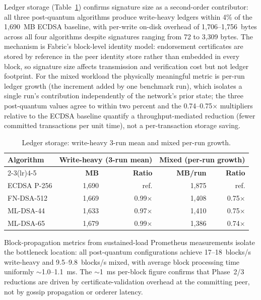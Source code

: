 \documentclass{ieeetj}
\begin{document}
Ledger storage (Table~\ref{tab:storage_results}) confirms signature
size as a second-order contributor: all three post-quantum algorithms
produce write-heavy ledgers within 4\% of the 1{,}690~MB ECDSA
baseline, with per-write on-disk overhead of 1{,}706--1{,}756~bytes
across all four algorithms despite signatures ranging from 72 to
3{,}309 bytes. The mechanism is Fabric's block-level identity model:
endorsement certificates are stored by reference in the peer identity
store rather than embedded in every block, so signature size affects
transmission and verification cost but not ledger footprint. For the
mixed workload the physically meaningful metric is per-run ledger
growth (the increment added by one benchmark run), which isolates a
single run's contribution independently of the network's prior
state; the three post-quantum values agree to within two percent and
the 0.74--0.75$\times$ multipliers relative to the ECDSA baseline
quantify a throughput-mediated reduction (fewer committed
transactions per unit time), not a per-transaction storage saving.

\begin{table}[ht]
\centering
\caption{Ledger storage: write-heavy 3-run mean and mixed per-run growth.}
\label{tab:storage_results}
\footnotesize

\begin{tabular*}{\columnwidth}{@{\extracolsep{\fill}}lrrrr@{}}
\toprule
\textbf{Algorithm} &
\multicolumn{2}{c}{\textbf{Write-heavy (3-run mean)}} &
\multicolumn{2}{c}{\textbf{Mixed (per-run growth)}} \\
\cmidrule(lr){2-3}\cmidrule(lr){4-5}
& \textbf{MB} & \textbf{Ratio} & \textbf{MB/run} & \textbf{Ratio} \\
\midrule
ECDSA P-256 & 1,690 & ref.        & 1,875 & ref.         \\
FN-DSA-512  & 1,669 & 0.99$\times$ & 1,408 & 0.75$\times$ \\
ML-DSA-44   & 1,633 & 0.97$\times$ & 1,410 & 0.75$\times$ \\
ML-DSA-65   & 1,679 & 0.99$\times$ & 1,386 & 0.74$\times$ \\
\bottomrule
\end{tabular*}
\end{table}
Block-propagation metrics from sustained-load Prometheus measurements
isolate the bottleneck location: all post-quantum configurations achieve
17--18~blocks/s write-heavy and 9.5--9.8~blocks/s mixed, with average
block processing time uniformly $\sim$1.0--1.1~ms. The $\sim$1~ms
per-block figure confirms that Phase~2/3 reductions are driven by
certificate-validation overhead at the committing peer, not by gossip
propagation or orderer latency.
\end{document}

